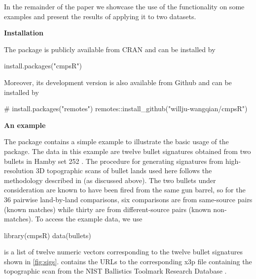 In the remainder of the paper we showcase the use of the 
functionality on some examples and present the results of applying it to
two datasets.

\textbf{Installation}

The  package is publicly available from CRAN and can be
installed by

\begin{Schunk}
\begin{Sinput}
install.packages("cmpsR") 
\end{Sinput}
\end{Schunk}

Moreover, its development version is also available from Github and can
be installed by

\begin{Schunk}
\begin{Sinput}
# install.packages("remotes") 
remotes::install_github("willju-wangqian/cmpsR")
\end{Sinput}
\end{Schunk}

\textbf{An example}

The  package contains a simple example to illustrate the
basic usage of the package. The data in this example are twelve bullet
signatures obtained from two bullets in Hamby set 252 \citep{hamby}. The
procedure for generating signatures from high-resolution 3D topographic
scans of bullet lands used here follows the methodology described in
\citet{aoas} (as discussed above). The two bullets under consideration
are known to have been fired from the same gun barrel, so for the 36
pairwise land-by-land comparisons, six comparisons are from same-source
pairs (known matches) while thirty are from different-source pairs
(known non-matches). To access the example data, we use

\begin{Schunk}
\begin{Sinput}
library(cmpsR)
data(bullets)
\end{Sinput}
\end{Schunk}

 is a list of twelve numeric vectors corresponding
to the twelve bullet signatures shown in \autoref{fig:sigs}.
 contains the URLs to the corresponding x3p file
containing the topographic scan from the NIST Ballistics Toolmark
Research Database \citep{nistdb}.

